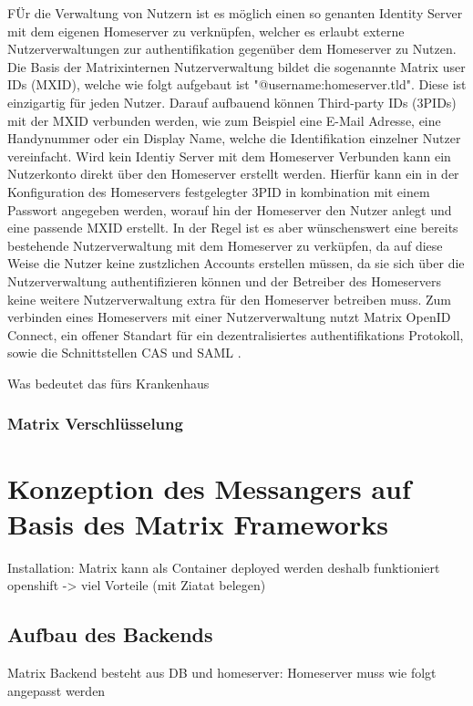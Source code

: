 FÜr die Verwaltung von Nutzern ist es möglich einen so genanten Identity Server mit dem eigenen Homeserver zu verknüpfen, welcher es erlaubt externe Nutzerverwaltungen zur authentifikation gegenüber dem Homeserver zu Nutzen. Die Basis der Matrixinternen Nutzerverwaltung bildet die sogenannte Matrix user IDs (MXID), welche wie folgt aufgebaut ist "@username:homeserver.tld". Diese ist einzigartig für jeden Nutzer. Darauf aufbauend können Third-party IDs (3PIDs) mit der MXID verbunden werden, wie zum Beispiel eine E-Mail Adresse, eine Handynummer oder ein Display Name, welche die Identifikation einzelner Nutzer vereinfacht. Wird kein Identiy Server mit dem Homeserver Verbunden kann ein Nutzerkonto direkt über den Homeserver erstellt werden. Hierfür kann ein in der Konfiguration des Homeservers festgelegter 3PID in kombination mit einem Passwort angegeben werden, worauf hin der Homeserver den Nutzer anlegt und eine passende MXID erstellt. In der Regel ist es aber wünschenswert eine bereits bestehende Nutzerverwaltung mit dem Homeserver zu verküpfen, da auf diese Weise die Nutzer keine zustzlichen Accounts erstellen müssen, da sie sich über die Nutzerverwaltung authentifizieren können und der Betreiber des Homeservers keine weitere Nutzerverwaltung extra für den Homeserver betreiben muss. Zum verbinden eines Homeservers mit einer Nutzerverwaltung nutzt Matrix OpenID Connect, ein offener Standart für ein dezentralisiertes authentifikations Protokoll, sowie die Schnittstellen CAS und SAML .


Was bedeutet das fürs Krankenhaus

\subsubsection{Matrix Verschlüsselung}\label{chapter:aemn}

\section{Konzeption des Messangers auf Basis des Matrix Frameworks}\label{chapter:km}
Installation: Matrix kann als Container deployed werden deshalb funktioniert openshift -> viel Vorteile (mit Ziatat belegen)



\subsection{Aufbau des Backends}\label{chapter:am}
Matrix Backend besteht aus DB und homeserver: Homeserver muss wie folgt angepasst werden

